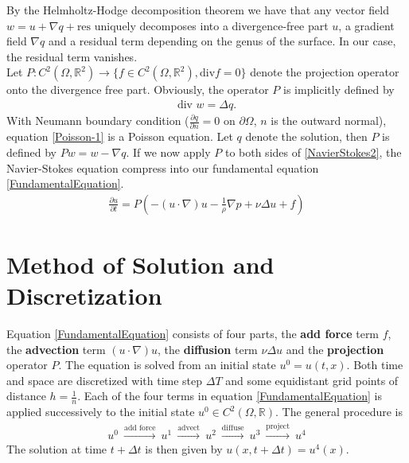 \documentclass[a4paper,10pt,oneside,final,german,openbib,pdftex,titlepage]{scrbook}
\begin{document}
By the Helmholtz-Hodge decomposition theorem we have that any vector field $w = u + \nabla q + \text{res}$ uniquely decomposes into a divergence-free part $u$, a gradient field $\nabla q$ and a residual term depending on the genus of the surface. In our case, the residual term vanishes.\\

Let $P : C^2(\Omega,\mathbb{R}^2) \rightarrow \{f\in C^2(\Omega, \mathbb{R}^2), \text{div} f = 0\}$ denote the projection operator onto the divergence free part. Obviously, the operator $P$ is implicitly defined by 
\begin{align}
	\text{div } w = \Delta q. \label{Poisson-1}
\end{align}
With Neumann boundary condition ($\frac{\partial q}{\partial n} = 0$ on $\partial \Omega$, $n$ is the outward normal), equation \ref{Poisson-1} is a Poisson equation. Let $q$ denote the solution, then $P$ is defined by $Pw = w - \nabla q$. 
If we now apply $P$ to both sides of \ref{NavierStokes2}, the Navier-Stokes equation compress into our fundamental equation \ref{FundamentalEquation}.
\begin{align}
	\frac{\partial u}{\partial t} = P \left(- (u \cdot \nabla)u - \frac{1}{\rho}\nabla p + \nu \Delta u + f \right) \label{FundamentalEquation}
\end{align}
\section{Method of Solution and Discretization}
Equation \ref{FundamentalEquation} consists of four parts, the \textbf{add force} term $f$, the \textbf{advection} term $(u\cdot \nabla )u$, the \textbf{diffusion} term $\nu \Delta u$ and the \textbf{projection} operator $P$. The equation is solved from an initial state $u^0 = u(t,x)$. Both time and space are discretized with time step $\Delta T$ and some equidistant grid points of distance $h= \frac{1}{n}$.
Each of the four terms in equation \ref{FundamentalEquation} is applied successively to the initial state $u^0 \in C^2(\Omega,\mathbb{R})$. The general procedure is
\begin{align*}
	u^0 ~\overset{\text{add force}}{\longrightarrow}~ u^1 ~ \overset{\text{advect}}{\longrightarrow}~ u^2 ~\overset{\text{diffuse}}{\longrightarrow} ~u^3~ \overset{\text{project}}{\longrightarrow} ~u^4
\end{align*}
The solution at time $t+\Delta t$ is then given by $u(x,t+\Delta t) = u^4(x)$.
\end{document}
